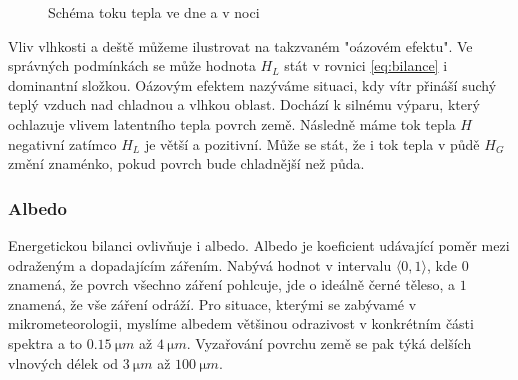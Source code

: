 \begin{figure}
\centering
\caption{Schéma toku tepla ve dne a v noci}
\label{fig:schema}
\end{figure}

Vliv vlhkosti a deště můžeme ilustrovat na takzvaném "oázovém efektu". Ve správných podmínkách se může hodnota $H_L$ stát v rovnici \eqref{eq:bilance} i dominantní složkou. Oázovým efektem nazýváme situaci, kdy vítr přináší suchý teplý vzduch nad chladnou a vlhkou oblast. Dochází k silnému výparu, který ochlazuje vlivem latentního tepla povrch země. Následně máme tok tepla $H$ negativní zatímco $H_L$ je větší a pozitivní. Může se stát, že i tok tepla v půdě $H_G$ změní znaménko, pokud povrch bude chladnější než půda\cite{arya2001}.

\subsubsection{Albedo}
Energetickou bilanci ovlivňuje i albedo. Albedo je koeficient udávající poměr mezi odraženým a dopadajícím zářením. Nabývá hodnot v intervalu $\langle 0,1\rangle$, kde $0$ znamená, že povrch všechno záření pohlcuje, jde o ideálně černé těleso, a $1$ znamená, že vše záření odráží. Pro situace, kterými se zabývamé v mikrometeorologii, myslíme albedem většinou odrazivost v konkrétním části spektra a to $\SI{0.15}{\micro m}$ až $\SI{4}{\micro m}$. Vyzařování povrchu země se pak týká delších vlnových délek od $\SI{3}{\micro m}$ až $\SI{100}{\micro m}$. 

